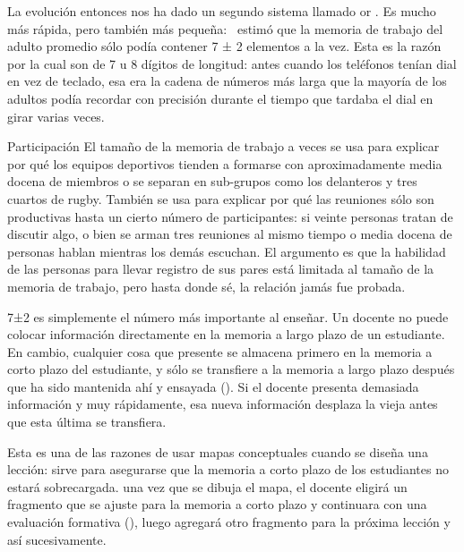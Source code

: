 La evolución entonces nos ha dado un segundo sistema
llamado 
or .
Es mucho más rápida,
pero también más pequeña:~\cite{Mill1956} estimó que la memoria de trabajo del adulto promedio sólo podía contener 7 ± 2 elementos a la vez.
Esta es la razón por la cual 
son de 7 u 8 dígitos de longitud:
antes cuando los teléfonos tenían dial en vez de teclado,
esa era la cadena de números más larga que la mayoría de los adultos podía recordar con precisión durante el tiempo que tardaba el dial en girar varias veces.

\begin{aside}{Participación}
  El tamaño de la memoria de trabajo a veces se usa para explicar por qué los equipos 
  deportivos tienden a formarse con aproximadamente media docena de miembros o
  se separan en sub-grupos como los delanteros y tres cuartos de rugby.
  También se usa para explicar por qué las reuniones sólo son productivas hasta un cierto número de participantes:
si veinte personas tratan de discutir algo,
o bien se arman tres reuniones al mismo tiempo
o media docena de personas hablan mientras los demás escuchan.
El argumento es que la habilidad de las personas para llevar registro de sus  pares está limitada al tamaño de la memoria de trabajo,
pero hasta donde sé,
la relación jamás fue probada.
\end{aside}

7±2 es simplemente el número más importante al enseñar.
Un docente no puede colocar información directamente en la memoria a largo plazo de un estudiante.
En cambio,
cualquier cosa que presente se almacena primero en la memoria a corto plazo del estudiante,
y sólo se transfiere a la memoria a largo plazo después que ha sido mantenida ahí y ensayada ().
Si el docente presenta demasiada información y muy rápidamente,
esa nueva información desplaza la vieja antes que esta última se transfiera.

Esta es una de las razones de usar mapas conceptuales cuando se diseña una lección:
sirve para asegurarse que la memoria a corto plazo de los estudiantes no estará sobrecargada.
una vez que se dibuja el mapa,
el docente eligirá un fragmento que se ajuste para la memoria a corto plazo y continuara con una evaluación formativa (),
luego agregará otro fragmento para la próxima lección y así sucesivamente.

